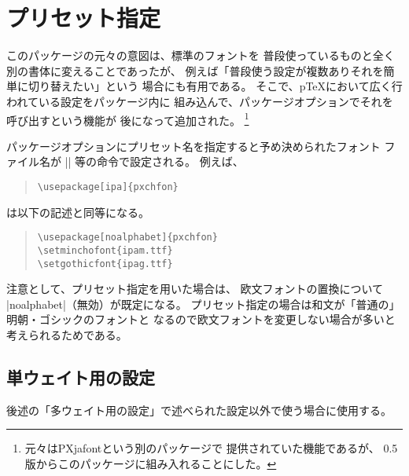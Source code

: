 \documentclass[uplatex,dvipdfmx,a4paper]{jsarticle}
\newcommand{\Pkg}[1]{\textsf{#1}}
\providecommand{\pTeX}{p\TeX}
\begin{document}
\section{プリセット指定}
\label{sec:Preset}

このパッケージの元々の意図は、標準のフォントを
普段使っているものと全く別の書体に変えることであったが、
例えば「普段使う設定が複数ありそれを簡単に切り替えたい」という
場合にも有用である。
そこで、{\pTeX}において広く行われている設定をパッケージ内に
組み込んで、パッケージオプションでそれを呼び出すという機能が
後になって追加された。
\footnote{元々は\Pkg{PXjafont}という別のパッケージで
提供されていた機能であるが、
0.5版からこのパッケージに組み入れることにした。}

パッケージオプションにプリセット名を指定すると予め決められたフォント
ファイル名が |\setminchofont| 等の命令で設定される。
例えば、
\begin{quote}\small\begin{verbatim}
\usepackage[ipa]{pxchfon}
\end{verbatim}\end{quote}
は以下の記述と同等になる。
\begin{quote}\small\begin{verbatim}
\usepackage[noalphabet]{pxchfon}
\setminchofont{ipam.ttf}
\setgothicfont{ipag.ttf}
\end{verbatim}\end{quote}

注意として、プリセット指定を用いた場合は、
欧文フォントの置換について |noalphabet|（無効）が既定になる。
プリセット指定の場合は和文が「普通の」明朝・ゴシックのフォントと
なるので欧文フォントを変更しない場合が多いと考えられるためである。

\subsection{単ウェイト用の設定}

後述の「多ウェイト用の設定」で述べられた設定以外で使う場合に使用する。
\end{document}
